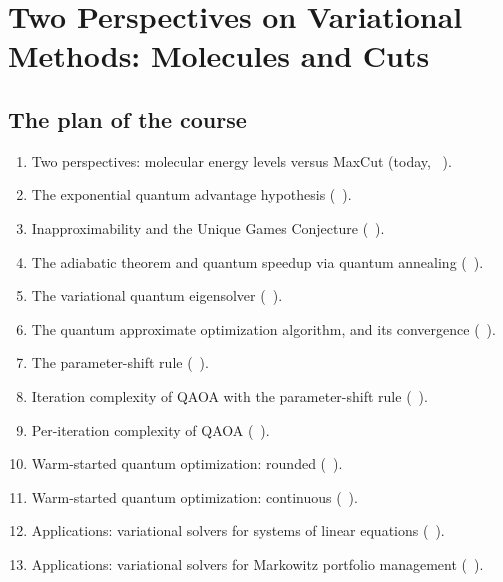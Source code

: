 \documentclass[overheadsbeamer.tex]{subfiles}
\begin{document}
\thispagestyle{empty}

\ona{ \setcounter{chapter}{0} } %
\chapter{Two Perspectives on Variational Methods: Molecules and Cuts}\label{C.Motivation}

\section{The plan of the course}

\begin{frame}
\onp{\footnotesize}
\begin{enumerate}\setlength\itemsep{0.05em}
    \item Two perspectives: molecular energy levels versus MaxCut (today, \Chap~).
    \item The exponential quantum advantage hypothesis (\Chap~).
    \item Inapproximability and the Unique Games Conjecture (\Chap~).
    \item The adiabatic theorem and quantum speedup via quantum annealing (\Chap~).
    \item The variational quantum eigensolver (\Chap~).
    \item The quantum approximate optimization algorithm, and its convergence (\Chap~).
    \item The parameter-shift rule (\Chap~).
    \item Iteration complexity of QAOA with the parameter-shift rule (\Chap~).
    \item Per-iteration complexity of QAOA (\Chap~).
    \item Warm-started quantum optimization: rounded (\Chap~).
    \item Warm-started quantum optimization: continuous (\Chap~).
    \item Applications: variational solvers for systems of linear equations (\Chap~).
    \item Applications: variational solvers for Markowitz portfolio management (\Chap~).
\end{enumerate}
\end{frame}
\end{document}
